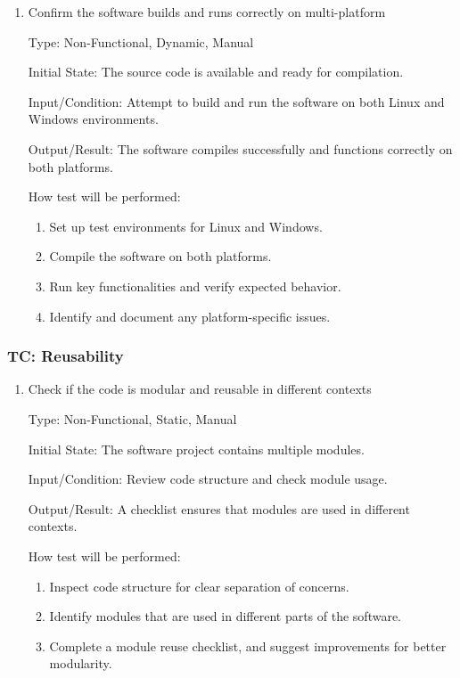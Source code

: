 \documentclass[12pt, titlepage]{article}
\begin{document}
\begin{enumerate}

  \item{Confirm the software builds and runs correctly on multi-platform \\}

  Type: Non-Functional, Dynamic, Manual

  Initial State: The source code is available and ready for compilation.

  Input/Condition: Attempt to build and run the software on both Linux and
  Windows environments.

  Output/Result: The software compiles successfully and functions correctly on
  both platforms.

  How test will be performed:
  \begin{enumerate}
    \item Set up test environments for Linux and Windows.
    \item Compile the software on both platforms.
    \item Run key functionalities and verify expected behavior.
    \item Identify and document any platform-specific issues.
  \end{enumerate}
\end{enumerate}

 \label{TC_REUSABILITY}
\subsubsection{TC\thetestcasenum : Reusability}

\begin{enumerate}

  \item{Check if the code is modular and reusable in different contexts \\}

  Type: Non-Functional, Static, Manual

  Initial State: The software project contains multiple modules.

  Input/Condition: Review code structure and check module usage.

  Output/Result: A checklist ensures that modules are used in different
  contexts.

  How test will be performed:
  \begin{enumerate}
    \item Inspect code structure for clear separation of concerns.
    \item Identify modules that are used in different parts of the software.
    \item Complete a module reuse checklist, and suggest improvements for better
    modularity.
  \end{enumerate}
\end{enumerate}
\end{document}

